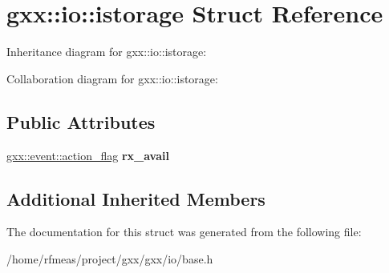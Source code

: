 \hypertarget{structgxx_1_1io_1_1istorage}{}\section{gxx\+:\+:io\+:\+:istorage Struct Reference}
\label{structgxx_1_1io_1_1istorage}


Inheritance diagram for gxx\+:\+:io\+:\+:istorage\+:


Collaboration diagram for gxx\+:\+:io\+:\+:istorage\+:
\subsection*{Public Attributes}
\begin{DoxyCompactItemize}
\item 
\hyperlink{classgxx_1_1event_1_1action__flag}{gxx\+::event\+::action\+\_\+flag} {\bfseries rx\+\_\+avail}\hypertarget{structgxx_1_1io_1_1istorage_af3f03ec693efe3f4c5462c5efb3d271e}{}\label{structgxx_1_1io_1_1istorage_af3f03ec693efe3f4c5462c5efb3d271e}

\end{DoxyCompactItemize}
\subsection*{Additional Inherited Members}


The documentation for this struct was generated from the following file\+:\begin{DoxyCompactItemize}
\item 
/home/rfmeas/project/gxx/gxx/io/base.\+h\end{DoxyCompactItemize}
